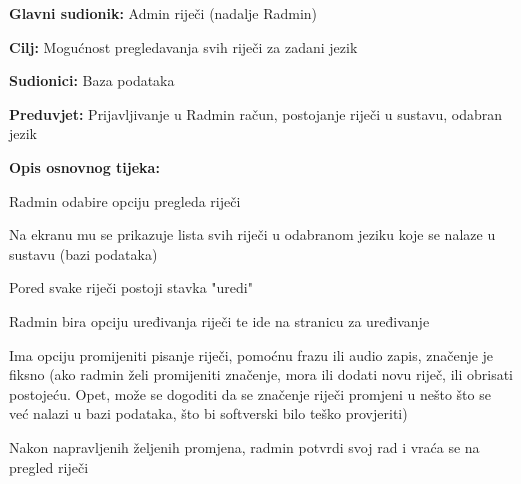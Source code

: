 \noindent {}
\begin{packed_item}

	\item \textbf{Glavni sudionik: } Admin riječi (nadalje Radmin)
	\item \textbf{Cilj: } Mogućnost pregledavanja svih riječi za zadani jezik
	\item \textbf{Sudionici: } Baza podataka
	\item \textbf{Preduvjet: } Prijavljivanje u Radmin račun, postojanje riječi u sustavu, odabran jezik
	\item  \textbf{Opis osnovnog tijeka:}
	
	\item[] \begin{packed_enum}
		
		\item Radmin odabire opciju pregleda riječi
		\item Na ekranu mu se prikazuje lista svih riječi u odabranom jeziku koje se nalaze u sustavu (bazi podataka)
		\item Pored svake riječi postoji stavka "uredi"
		\item Radmin bira opciju uređivanja riječi te ide na stranicu za uređivanje
		\item Ima opciju promijeniti pisanje riječi, pomoćnu frazu ili audio zapis, značenje je fiksno (ako radmin želi promijeniti značenje, mora ili dodati novu riječ, ili obrisati postojeću. Opet, može se dogoditi da se značenje riječi promjeni u nešto što se već nalazi u bazi podataka, što bi softverski bilo teško provjeriti)
		\item Nakon napravljenih željenih promjena, radmin potvrdi svoj rad i vraća se na pregled riječi

	\end{packed_enum}
	
\end{packed_item}


